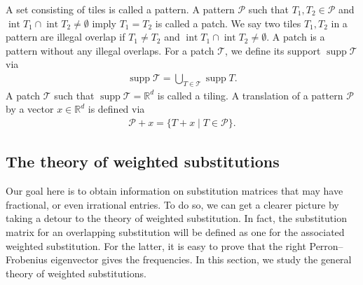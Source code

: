 \documentclass[a4]{amsart}
\DeclareMathOperator{\supp}{supp}
\DeclareMathOperator{\Int}{int}
\theoremstyle{definition}
\begin{document}
A set consisting of tiles is called a pattern.
A pattern $\mathcal{P}$  such that
$T_1,T_2\in\mathcal{P}$ and $\Int T_1\cap\Int T_2\neq\emptyset$ imply $T_1=T_2$ is called a patch.
We say two tiles $T_1,T_2$ in a pattern are illegal overlap if $T_1\neq T_2$ and
$\Int T_1\cap\Int T_2\neq\emptyset$.
A patch is a pattern without any illegal overlaps.
For a patch $\mathcal{T}$, we define its support $\supp\mathcal{T}$ via
\begin{align*}
     \supp\mathcal{T}=\bigcup_{T\in\mathcal{T}}\supp T.
\end{align*}
A patch $\mathcal{T}$ such that $\supp\mathcal{T}=\mathbb{R}^d$ is called a tiling.
A translation of a pattern $\mathcal{P}$ by a vector $x\in\mathbb{R}^d$ is defined via
\begin{align*}
    \mathcal{P}+x=\{T+x\mid T\in\mathcal{P}\}.
\end{align*}

\subsection{The theory of weighted substitutions}

{\color{blue}Our goal here is to obtain information on substitution matrices that may have
fractional, or even irrational entries. To do so, we can get
a clearer picture by taking a detour to
the theory of weighted substitution.
In fact, the substitution matrix for an overlapping substitution will be defined as one for the associated weighted substitution.
For the latter, it is easy to prove that the right Perron--Frobenius eigenvector gives the frequencies.
In this section, we study the general
theory of weighted substitutions.}
\end{document}
